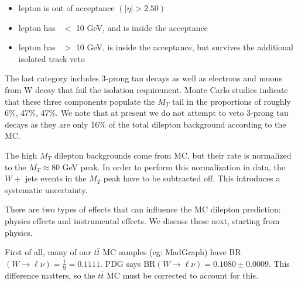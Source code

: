 \begin{itemize}
\item lepton is out of acceptance $(|\eta| > 2.50)$
\item lepton has \pt\ $<$ 10 GeV, and is inside the acceptance
\item lepton has \pt\ $>$ 10 GeV, is inside the acceptance, but survives the additional isolated track veto
\end{itemize}


The last category includes 3-prong tau decays as well as electrons and muons from W decay that fail the isolation requirement.
Monte Carlo studies indicate that these three components populate the $M_T$ tail in the proportions of roughly  6\%, 47\%, 47\%. 
We note that at present we do not attempt to veto 3-prong tau decays as they are only 16\% of the total dilepton background according to the MC.

The high $M_T$ dilepton backgrounds come from MC, but their rate is normalized to the 
$M_T \approx 80$ GeV peak.  In order to perform this normalization in data, the $W +$ jets
events in the $M_T$ peak have to be subtracted off.  This introduces a systematic uncertainty.

There are two types of effects that can influence the MC dilepton prediction: physics effects 
and instrumental effects.  We discuss these next, starting from physics.

First of all, many of our $t\bar{t}$ MC samples (eg: MadGraph) have
 BR$(W \to \ell \nu)=\frac{1}{9} = 0.1111$.
PDG says BR$(W \to \ell \nu) = 0.1080 \pm 0.0009$.  This difference matters, so the $t\bar{t}$ MC 
must be corrected to account for this.

